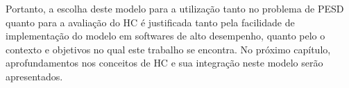 Portanto, a escolha deste modelo para a utilização tanto no problema de \ac{PESD} quanto para a avaliação do \ac{HC} é justificada tanto pela facilidade de implementação do modelo em softwares de alto desempenho, quanto pelo o contexto e objetivos no qual este trabalho se encontra. No próximo capítulo, aprofundamentos nos conceitos de \ac{HC} e sua integração neste modelo serão apresentados.